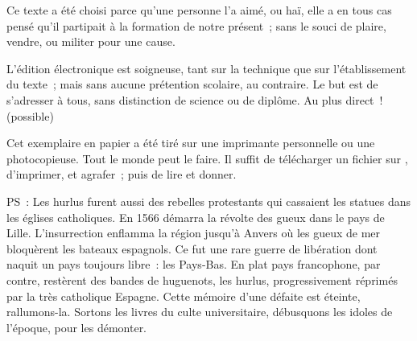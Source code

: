 \documentclass[french,twoside]{book} %
\newif\ifdev
\renewcommand{\LettrineFontHook}{\color{rubric}}
\newcommand{\initialiv}[2]{%
  \let\oldLFH\LettrineFontHook
  \IfSubStr{QJ’}{#1}{
    \lettrine[lines=4, lhang=0.2, loversize=-0.1, lraise=0.2]{\smash{#1}}{#2}
  }{\IfSubStr{É}{#1}{
    \lettrine[lines=4, lhang=0.2, loversize=-0, lraise=0]{\smash{#1}}{#2}
  }{\IfSubStr{ÀÂ}{#1}{
    \lettrine[lines=4, lhang=0.2, loversize=-0, lraise=0, slope=0.6em]{\smash{#1}}{#2}
  }{\IfSubStr{A}{#1}{
    \lettrine[lines=4, lhang=0.2, loversize=0.2, slope=0.6em]{\smash{#1}}{#2}
  }{\IfSubStr{V}{#1}{
    \lettrine[lines=4, lhang=0.2, loversize=0.2, slope=-0.5em]{\smash{#1}}{#2}
  }{
    \lettrine[lines=4, lhang=0.2, loversize=0.2]{\smash{#1}}{#2}
  }}}}}
  \let\LettrineFontHook\oldLFH
}
\renewcommand{\LettrineFontHook}{\bfseries\color{rubric}}
\begin{document}
  Ce texte a été choisi parce qu’une personne l’a aimé,
  ou haï, elle a en tous cas pensé qu’il partipait à la formation de notre présent ;
  sans le souci de plaire, vendre, ou militer pour une cause.
  \par

  L’édition électronique est soigneuse, tant sur la technique
  que sur l’établissement du texte ; mais sans aucune prétention scolaire, au contraire.
  Le but est de s’adresser à tous, sans distinction de science ou de diplôme.
  Au plus direct ! (possible)
  \par

  Cet exemplaire en papier a été tiré sur une imprimante personnelle
   ou une photocopieuse. Tout le monde peut le faire.
  Il suffit de
  télécharger un fichier sur \href{https://hurlus.fr}{},
  d’imprimer, et agrafer ; puis de lire et donner.\par

  \bigskip

  \noindent PS : Les hurlus furent aussi des rebelles protestants qui cassaient les statues dans les églises catholiques. En 1566 démarra la révolte des gueux dans le pays de Lille. L’insurrection enflamma la région jusqu’à Anvers où les gueux de mer bloquèrent les bateaux espagnols.
  Ce fut une rare guerre de libération dont naquit un pays toujours libre : les Pays-Bas.
  En plat pays francophone, par contre, restèrent des bandes de huguenots, les hurlus, progressivement réprimés par la très catholique Espagne.
  Cette mémoire d’une défaite est éteinte, rallumons-la. Sortons les livres du culte universitaire, débusquons les idoles de l’époque, pour les démonter.
\fi

\ifdev %
\fontname\font — \textsc{Les règles du jeu}\par
(\hyperref[utopie]{\underline{Lien}})\par
\noindent \initialiv{A}{lors là}\blindtext\par
\noindent \initialiv{À}{ la bonheur des dames}\blindtext\par
\noindent \initialiv{É}{tonnez-le}\blindtext\par
\noindent \initialiv{Q}{ualitativement}\blindtext\par
\noindent \initialiv{V}{aloriser}\blindtext\par
\Blindtext
\phantomsection
\label{utopie}
\Blinddocument
\fi
\end{document}
